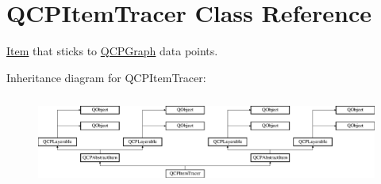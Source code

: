 \hypertarget{class_q_c_p_item_tracer}{}\section{Q\+C\+P\+Item\+Tracer Class Reference}
\label{class_q_c_p_item_tracer}


\hyperlink{class_item}{Item} that sticks to \hyperlink{class_q_c_p_graph}{Q\+C\+P\+Graph} data points.  


Inheritance diagram for Q\+C\+P\+Item\+Tracer\+:\begin{figure}[H]
\begin{center}
\leavevmode
\includegraphics[height=3.017241cm]{class_q_c_p_item_tracer}
\end{center}
\end{figure}
